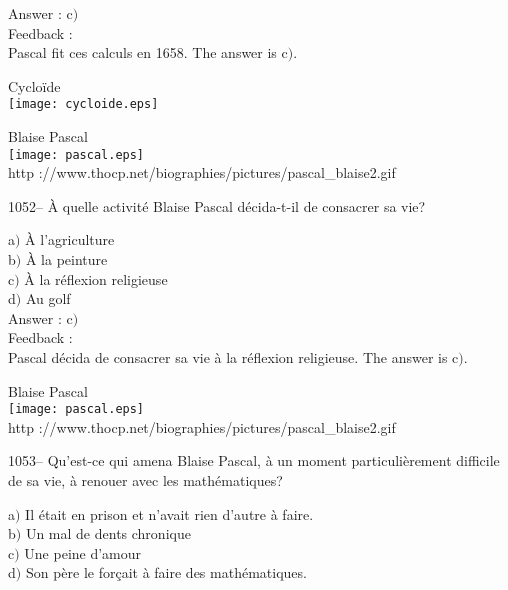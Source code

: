 ﻿\documentclass[letterpaper, 12pt]{article}
\begin{document}
Answer : c$)$\\

Feedback : \\
Pascal fit ces calculs en 1658.
The answer is c$)$.\\

        \begin{center}

Cyclo\"ide\\
    \texttt{[image: cycloide.eps]}\\
    \end{center}

        \begin{center}
        Blaise Pascal\\
    \texttt{[image: pascal.eps]}\\
        {\footnotesize http
://www.thocp.net/biographies/pictures/pascal\_blaise2.gif}
    \end{center}

1052-- \`A quelle activit\'e Blaise Pascal d\'ecida-t-il de
consacrer sa vie?

a$)$ \`A l'agriculture \\
b$)$ \`A la peinture  \\
c$)$ \`A la r\'eflexion religieuse  \\
d$)$ Au golf\\

Answer : c$)$\\

Feedback : \\
Pascal d\'ecida de consacrer sa vie \`a la r\'eflexion religieuse.
The answer is c$)$.\\

        \begin{center}
        Blaise Pascal\\
    \texttt{[image: pascal.eps]}\\
        {\footnotesize http
://www.thocp.net/biographies/pictures/pascal\_blaise2.gif}
    \end{center}

1053-- Qu'est-ce qui amena Blaise Pascal, \`a un moment
particuli\`erement difficile de sa vie, \`a renouer avec les
math\'ematiques?

a$)$ Il \'etait en prison et n'avait rien d'autre \`a faire. \\
b$)$ Un mal de dents chronique  \\
c$)$ Une peine d'amour  \\
d$)$ Son p\`ere le for\c cait \`a faire des math\'ematiques.\\
\end{document}
